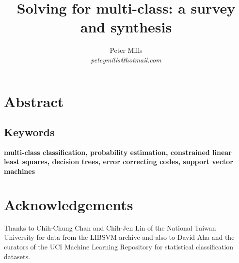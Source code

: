 \documentclass{article}
\begin{document}
\title{Solving for multi-class: a survey and synthesis}

\author{Peter Mills\\\textit{peteymills@hotmail.com}}

\maketitle

\begin{center}
	\setlength{\fboxsep}{0pt}
	\setlength{\fboxrule}{1pt}
\end{center}

\section*{Abstract}



\subsection*{Keywords}
\textbf{multi-class classification,
probability estimation,
constrained linear least squares,
decision trees,
error correcting codes,
support vector machines}

\tableofcontents



\appendix

\section*{Acknowledgements}

Thanks to Chih-Chung Chan and Chih-Jen Lin of the National Taiwan University
for data from the LIBSVM archive and also to David Aha and the curators of
the UCI Machine Learning Repository for statistical classification datasets.


\end{document}
